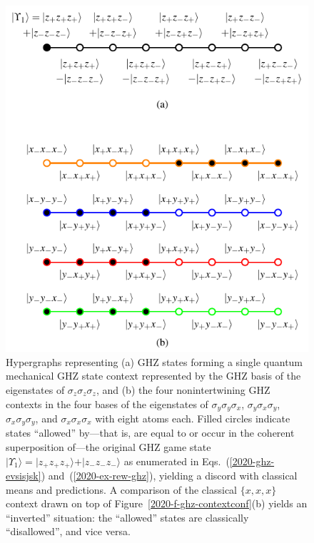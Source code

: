 \documentclass[sn-mathphys]{sn-jnl}%
\theoremstyle{thmstyleone}%
\theoremstyle{thmstyletwo}%
\theoremstyle{thmstylethree}%
\begin{document}
\begin{figure}[h]%
\begin{center}
\includegraphics{2020-ghz-exfigures-figure1}
\end{center}
\caption{\label{2020-f-ghz-contextqm}
Hypergraphs representing  (a) GHZ states forming a single quantum mechanical GHZ state context
represented by the GHZ basis of the eigenstates of $\sigma_z \sigma_z \sigma_z$,
and (b) the four nonintertwining GHZ contexts in the four bases of the eigenstates of
$\sigma_y \sigma_y \sigma_x$, $\sigma_y \sigma_x \sigma_y$, $\sigma_x \sigma_y \sigma_y$,  and $\sigma_x \sigma_x \sigma_x$
with eight atoms each.
Filled circles indicate states ``allowed'' by---that is, are equal to or
occur in the coherent superposition of---the original GHZ game state
$\vert \Upsilon_1 \rangle = \vert z_+z_+z_+ \rangle  + \vert z_-z_-z_- \rangle$
as enumerated in Eqs.~(\ref{2020-ghz-evsisjsk}) and~(\ref{2020-ex-rew-ghz}),
yielding a discord with classical means and predictions.
A comparison of the classical $\{x,x,x\}$ context drawn on top of Figure~\ref{2020-f-ghz-contextconf}(b)
yields an ``inverted'' situation:
the ``allowed'' states are classically ``disallowed'', and vice versa.
}
\end{figure}
\end{document}
